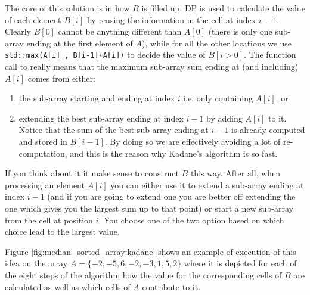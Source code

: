 The core of this solution is in how $B$ is filled up. DP is used to calculate the value of each element $B[i]$ by reusing the information in the cell at index $i-1$. Clearly $B[0]$ cannot be anything different than $A[0]$ (there is only one sub-array ending at the first element of $A$), while for all the other locations we use \lstinline[columns=fixed]{std::max(A[i] , B[i-1]+A[i])} to decide the value of $B[i > 0 ]$. 
The function call to  really means that the maximum sub-array sum ending at (and including) $A[i]$ comes from either:
\begin{enumerate}
	\item the sub-array starting and ending at index $i$ i.e. only containing $A[i]$, or
	\item extending the best sub-array ending at index $i-1$ by adding $A[i]$ to it. Notice that the sum of the
	best sub-array ending at $i-1$ is already computed and stored in $B[i-1]$. By doing so we are
	effectively avoiding a lot of re-computation, and this is the reason why Kadane's algorithm is
	so fast.
\end{enumerate}
If you think about it it make sense to construct $B$ this way. After all, when processing an element $A[i]$ you can either use it to extend a sub-array ending at index $i-1$ (and if you are going to extend one you are better off extending the one which gives you the largest sum up to that point) or start a new sub-array from the cell at position $i$. You choose one of the two option based on which choice lead to the largest value. 

Figure \ref{fig:median_sorted_array:kadane} shows an example of execution of this idea on the array $A=\{-2,-5,6,-2,-3,1,5,2\}$ where it is depicted for each of the eight steps of the algorithm how the value for the corresponding cells of $B$ are calculated as well as which cells of $A$ contribute to it.

